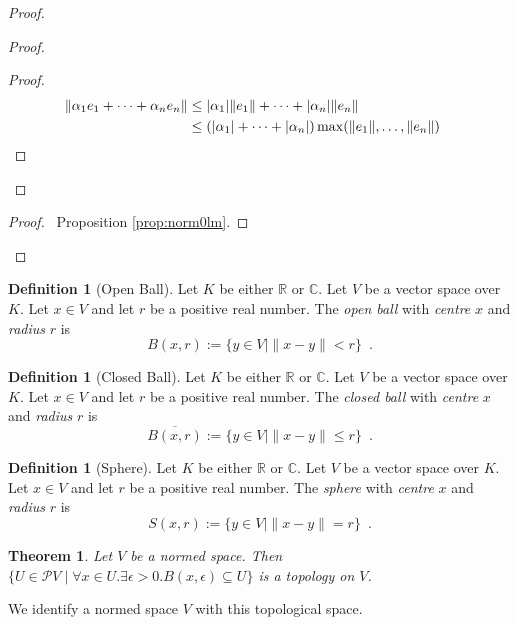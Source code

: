 \documentclass{book}
\let\qed\relax
\newtheorem{thm}[ax]{Theorem}
\theoremstyle{definition}
\newtheorem{df}[ax]{Definition}
\begin{document}
\begin{proof}
\begin{proof}
	\begin{proof}
		\pf
		\begin{align*}
			\| \alpha_1 e_1 + \cdots + \alpha_n e_n \|
			& \leq |\alpha_1| \| e_1 \| + \cdots + |\alpha_n| \|e_n\| \\
			& \leq (|\alpha_1| + \cdots + |\alpha_n|) \max(\|e_1\|, \ldots, \|e_n\|) & \qed
		\end{align*}
	\end{proof}
\end{proof}
\begin{proof}
	\pf\ Proposition \ref{prop:norm0lm}.
\end{proof}
\qed
\end{proof}

\begin{df}[Open Ball]
Let $K$ be either $\mathbb{R}$ or $\mathbb{C}$. Let $V$ be a vector space over $K$. Let $x \in V$ and let $r$ be a positive real number. The \emph{open ball} with \emph{centre} $x$ and \emph{radius} $r$ is
\[ B(x,r) := \{ y \in V \mid \| x - y \| < r \} \enspace . \]
\end{df}

\begin{df}[Closed Ball]
Let $K$ be either $\mathbb{R}$ or $\mathbb{C}$. Let $V$ be a vector space over $K$. Let $x \in V$ and let $r$ be a positive real number. The \emph{closed ball} with \emph{centre} $x$ and \emph{radius} $r$ is
\[ \overline{B(x,r)} := \{ y \in V \mid \| x - y \| \leq r \} \enspace . \]
\end{df}

\begin{df}[Sphere]
Let $K$ be either $\mathbb{R}$ or $\mathbb{C}$. Let $V$ be a vector space over $K$. Let $x \in V$ and let $r$ be a positive real number. The \emph{sphere} with \emph{centre} $x$ and \emph{radius} $r$ is
\[ S(x,r) := \{ y \in V \mid \| x - y \| = r \} \enspace . \]
\end{df}

\begin{thm}
Let $V$ be a normed space. Then $\{ U \in \mathcal{P} V \mid \forall x \in U. \exists \epsilon > 0. B(x, \epsilon) \subseteq U \}$ is a topology on $V$.
\end{thm}

We identify a normed space $V$ with this topological space.
\end{document}
